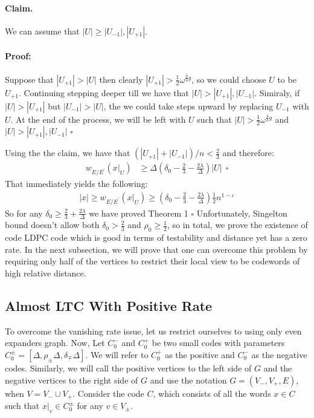 \documentclass{article}
\begin{document}
\begin{multicols*}{2}
\paragraph{Claim.} We can assume that $|U| \ge |U_{-1}|, |U_{+1}|$. 
\paragraph{Proof:} Suppose that $|U_{+1}| > |U|$ then clearly $|U_{+1}| > \frac{1}{2}\omega^{\frac{3}{4}g} $, so we could choose $U$ to be $U_{+1}$. Continuing stepping deeper till we have that $|U| > |U_{+1}|, |U_{-1}|$. Simiraly, if $|U| > |U_{+1}|$ but $|U_{-1}| > |U|$, the we could take steps upward by replacing $U_{-1}$ with $U$. At the end of the process, we will be left with $U$ such that $|U| > \frac{1}{2}\omega^{\frac{4}{3}g}$ and $|U| > |U_{+1}|, |U_{-1}|$ $\square$

Using the the claim, we have that $\left( |U_{+1}| + |U_{-1}| \right)/n <\frac{2}{3} $ and therefore:
\begin{equation*}
  \begin{split}
    w_{E/E^{\prime}}\left( x|_{U} \right) & \ge \Delta\left( \delta_{0} - \frac{2}{3} - \frac{2\lambda}{\Delta} \right)|U| \ \  \square 
  \end{split}
\end{equation*}
That immediately yields the following: 
\begin{equation*}
  \begin{split}
    |x| \ge  w_{E/E^{\prime}}\left( x|_{U} \right) \ge \left( \delta_{0} - \frac{2}{3} - \frac{2\lambda}{\Delta} \right)\frac{1}{2}n^{1-\varepsilon} 
  \end{split}
\end{equation*}
So for any $\delta_0 \ge \frac{2}{3} + \frac{2\lambda}{\Delta} $ we have proved Theorem 1 $\square$
Unfortunately, Singelton bound doesn't allow both $\delta_0 > \frac{2}{3}$ and $\rho_0 \ge \frac{1}{2}$, so in total, we prove the existence of code LDPC code which is good in terms of testability and distance yet has a zero rate. In the next subsection, we will prove that one can overcome this problem by requiring only half of the vertices to restrict their local view to be codewords of high relative distance. 
\subsection{ Almost LTC With Positive Rate } 
To overcome the vanishing rate issue, let us restrict ourselves to using only even expanders graph. Now, Let $C_{0}^{-}$ and $C_{0}^{+}$ be two small codes with parameters $C_{0}^{\pm} = [\Delta, \rho_{\pm}\Delta, \delta_{\mp}\Delta]$. We will refer to $C_{0}^{+}$ as the positive and $C_{0}^{-}$ as the negative codes. Similarly, we will call the positive vertices to the left side of $G$ and the negative vertices to the right side of $G$ and use the notation $G = \left( V_{-}, V_{+}, E \right)$, when $V = V_{-} \cup V_{+}$. 
Consider the code $C$, which consists of all the words $x\in C$ such that $x|_{v} \in C_{0}^{\pm}$ for any $v \in V_{\pm}$.

\end{multicols*}
\end{document}
